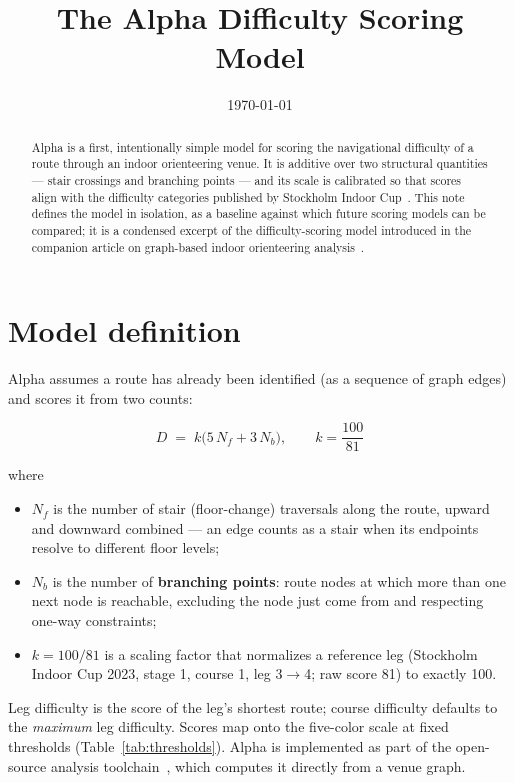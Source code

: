 \documentclass[11pt,a4paper,twocolumn]{article}
\title{The Alpha Difficulty Scoring Model}
\author{}
\date{\today}
\begin{document}
\maketitle

\begin{abstract}
Alpha is a first, intentionally simple model for scoring the navigational
difficulty of a route through an indoor orienteering venue. It is additive
over two structural quantities --- stair crossings and branching points ---
and its scale is calibrated so that scores align with the difficulty
categories published by Stockholm Indoor
Cup~\cite{sic-difficulty}. This note defines the model in isolation, as a
baseline against which future scoring models can be compared; it is a
condensed excerpt of the difficulty-scoring model introduced in the
companion article on graph-based indoor orienteering
analysis~\cite{foundation}.
\end{abstract}

\section{Model definition}
\label{sec:model}

Alpha assumes a route has already been identified (as a sequence of graph
edges) and scores it from two counts:

\[
D \;=\; k \bigl(5\,N_f + 3\,N_b\bigr), \qquad k = \frac{100}{81}
\]

where

\begin{itemize}
    \item $N_f$ is the number of stair (floor-change) traversals along the
          route, upward and downward combined --- an edge counts as a stair
          when its endpoints resolve to different floor levels;
    \item $N_b$ is the number of \textbf{branching points}: route nodes at
          which more than one next node is reachable, excluding the node
          just come from and respecting one-way constraints;
    \item $k = 100/81$ is a scaling factor that normalizes a reference leg
          (Stockholm Indoor Cup 2023, stage 1, course 1, leg 3$\to$4; raw
          score 81) to exactly 100.
\end{itemize}

Leg difficulty is the score of the leg's shortest route; course difficulty
defaults to the \emph{maximum} leg difficulty. Scores map onto the five-color
scale at fixed thresholds (Table~\ref{tab:thresholds}). Alpha is implemented
as part of the open-source analysis toolchain~\cite{repo}, which computes it
directly from a venue graph.
\end{document}
